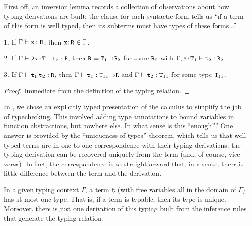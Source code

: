 \documentclass[11pt,twoside=off,numbers=noenddot]{scrbook}
\begin{document}
First off, an inversion lemma records a collection of observations
about how typing derivations are built: the clause for each syntactic
form tells us ``if a term of this form is well typed, then its
subterms must have types of these forms...''

\begin{lemma}
  1. If $\Gamma \vdash \texttt{x} : \texttt{R}$, then $\texttt{x:R} \in \Gamma$.

  2. If $\Gamma \vdash \texttt{$\lambda$x:$\texttt{T}_1$.$\texttt{t}_2$} :
  \texttt{R}$, then $\texttt{R} =
  \texttt{$\texttt{T}_1$$\rightarrow$$\texttt{R}_2$}$ for some $\texttt{R}_2$
  with $\Gamma, \texttt{x:$\texttt{T}_1$} \vdash \texttt{t}_2 : \texttt{R}_2$.

  3. If $\Gamma \vdash \texttt{$\texttt{t}_1$\,$\texttt{t}_2$} : \texttt{R}$,
  then $\Gamma \vdash \texttt{t}_1 :
  \texttt{$\texttt{T}_{11}$$\rightarrow$$\texttt{R}$}$ and $\Gamma \vdash
  \texttt{t}_2 : \texttt{T}_{11}$ for some type $\texttt{T}_{11}$.
\end{lemma}

\begin{proof}
  Immediate from the definition of the typing relation.
\end{proof}

In , we
chose an explicitly typed presentation of the calculus to simplify
the job of typechecking. This involved adding type annotations to
bound variables in function abstractions, but nowhere else. In what
sense is this ``enough''? One answer is provided by the ``uniqueness
of types'' theorem, which tells us that well-typed terms are in
one-to-one correspondence with their typing derivations: the typing
derivation can be recovered uniquely from the term (and, of course,
vice versa). In fact, the correspondence is so straightforward that,
in a sense, there is little difference between the term and the derivation.

\begin{theorem}
  In a given typing context $\Gamma$, a term $\texttt{t}$ (with free
  variables all in the domain of $\Gamma$) has at most one type. That
  is, if a term is typable, then its type is unique. Moreover, there
  is just one derivation of this typing built from the inference
  rules that generate the typing relation.
\end{theorem}
\end{document}
